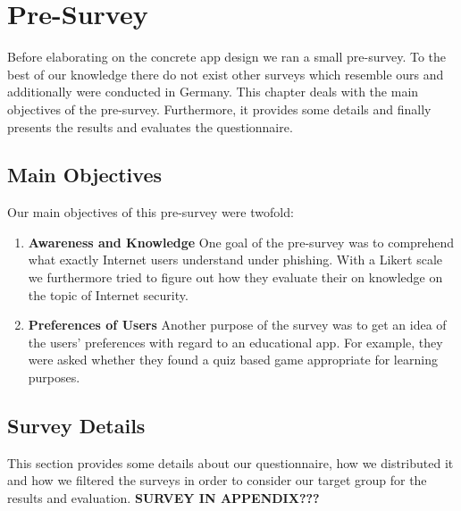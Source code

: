 \section{Pre-Survey}
\label{s:prestudy}
Before elaborating on the concrete app design we ran a small pre-survey. To the best of our knowledge there do not exist other surveys which resemble ours and additionally were conducted in Germany. This chapter deals with the main objectives of the pre-survey. Furthermore, it provides some details and finally presents the results and evaluates the questionnaire.

\subsection{Main Objectives}
Our main objectives of this pre-survey were twofold:

\begin{enumerate}
	\item \textbf{Awareness and Knowledge} One goal of the pre-survey was to comprehend what exactly Internet users understand under phishing. With a Likert scale we furthermore tried to figure out how they evaluate their on knowledge on the topic of Internet security.
	\item \textbf{Preferences of Users} Another purpose of the survey was to get an idea of the users' preferences with regard to an educational app. For example, they were asked whether they found a quiz based game appropriate for learning purposes.
\end{enumerate}
\subsection{Survey Details}
This section provides some details about our questionnaire, how we distributed it and how we filtered the surveys in order to consider our target group for the results and evaluation.
\textbf{SURVEY IN APPENDIX???}

